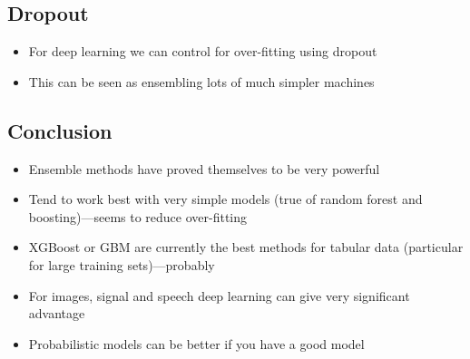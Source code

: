 \begin{slide}
\section{Dropout}

\pb
\begin{itemize}
\item For deep learning we can control for over-fitting using
  dropout\pause
  \begin{center}
    \pause
  \end{center}
\item This can be seen as ensembling lots of much simpler machines\pause
\end{itemize}


\end{slide}



\begin{slide}
\section{Conclusion}

\begin{PauseHighLight}
  \begin{itemize}
  \item Ensemble methods have proved themselves to be very
    powerful\pause
  \item Tend to work best with very simple models (true of random forest
    and boosting)\pause---seems to reduce over-fitting\pauseb
  \item XGBoost or GBM are currently the best methods for tabular data
    (particular for large training sets)\pause---probably\pauseb
  \item For images, signal and speech deep learning can give very
    significant advantage\pause
  \item Probabilistic models can be better if you have a good model\pause
  \end{itemize}
\end{PauseHighLight}

\end{slide}




